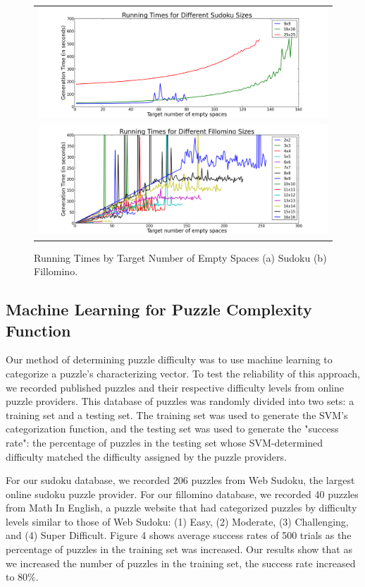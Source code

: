 \begin{figure}[!htpb]
\centering
\begin{tabular}{c}
 \includegraphics[scale=0.4]{experimentgraphs/sudokuRunTime3.png}
\\
\includegraphics[scale=0.4]{experimentgraphs/fillominoRunTime3.png}
\end{tabular}
\caption{Running Times by Target Number of Empty Spaces (a) Sudoku (b) Fillomino.}
\label{runtimes}
\end{figure}

\subsection{Machine Learning for Puzzle Complexity Function}

Our method of determining puzzle difficulty was to use machine learning to categorize a puzzle's characterizing vector. To test the reliability of this approach, we recorded published puzzles and their respective difficulty levels from online puzzle providers. This database of puzzles was randomly divided into two sets: a training set and a testing set. The training set was used to generate the SVM's categorization function, and the testing set was used to generate the "success rate": the percentage of puzzles in the testing set whose SVM-determined difficulty matched the difficulty assigned by the puzzle providers. 

For our sudoku database, we recorded 206 puzzles from Web Sudoku, the largest online sudoku puzzle provider. For our fillomino database, we recorded 40 puzzles from Math In English, a puzzle website that had categorized puzzles by difficulty levels similar to those of Web Sudoku: (1) Easy, (2) Moderate, (3) Challenging, and (4) Super Difficult. Figure 4 shows average success rates of 500 trials as the percentage of puzzles in the training set was increased. Our results show that as we increased the number of puzzles in the training set, the success rate increased to $80 \%$.

